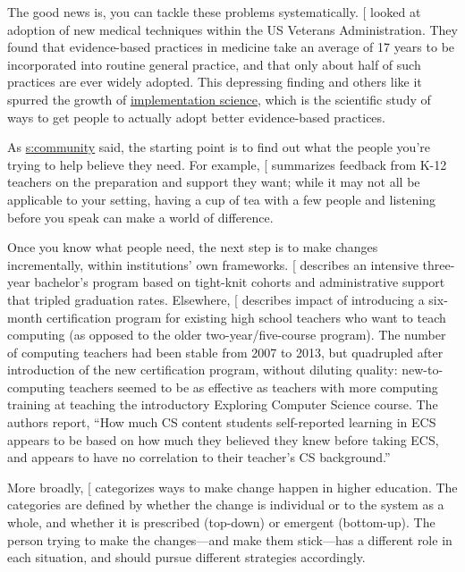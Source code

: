 The good news is, you can tackle these problems systematically.
{[}\protect[\hyperlink{b:Baue2015}{Baue2015}]{]} looked at adoption of new medical
techniques within the US Veterans Administration. They found that
evidence-based practices in medicine take an average of 17 years to be
incorporated into routine general practice, and that only about half
of such practices are ever widely adopted. This depressing finding and
others like it spurred the growth of \protect\hyperlink{g:implementation-science}{implementation
science}, which is the
scientific study of ways to get people to actually adopt better
evidence-based practices.

As \protect\hyperlink{CHAPTER}{s:community} said, the starting point is to find out what
the people you're trying to help believe they need. For example,
{[}\protect[\hyperlink{b:Yada2016}{Yada2016}]{]} summarizes feedback from K-12 teachers on the
preparation and support they want; while it may not all be applicable to
your setting, having a cup of tea with a few people and listening before
you speak can make a world of difference.

Once you know what people need, the next step is to make changes
incrementally, within institutions' own frameworks. {[}\protect[\hyperlink{b:Nara2018}{Nara2018}]{]}
describes an intensive three-year bachelor's program based on tight-knit
cohorts and administrative support that tripled graduation rates.
Elsewhere, {[}\protect[\hyperlink{b:Hu2017}{Hu2017}]{]} describes impact of introducing a six-month
certification program for existing high school teachers who want to
teach computing (as opposed to the older two-year/five-course program).
The number of computing teachers had been stable from 2007 to 2013, but
quadrupled after introduction of the new certification program, without
diluting quality: new-to-computing teachers seemed to be as effective as
teachers with more computing training at teaching the introductory
Exploring Computer Science course. The authors report, ``How much CS
content students self-reported learning in ECS appears to be based on
how much they believed they knew before taking ECS, and appears to have
no correlation to their teacher's CS background.''

More broadly, {[}\protect[\hyperlink{b:Borr2014}{Borr2014}]{]} categorizes ways to make change happen
in higher education. The categories are defined by whether the change is
individual or to the system as a whole, and whether it is prescribed
(top-down) or emergent (bottom-up). The person trying to make the
changes---and make them stick---has a different role in each situation, and
should pursue different strategies accordingly.

